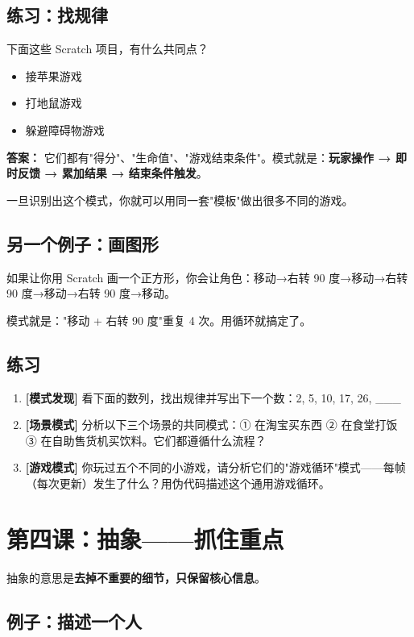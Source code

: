 \documentclass[a4paper,12pt]{ctexart}
\begin{document}
\subsection*{练习：找规律}

下面这些 Scratch 项目，有什么共同点？

\begin{itemize}
  \item 接苹果游戏
  \item 打地鼠游戏
  \item 躲避障碍物游戏
\end{itemize}

\textbf{答案：} 它们都有"得分"、"生命值"、"游戏结束条件"。模式就是：\textbf{玩家操作 → 即时反馈 → 累加结果 → 结束条件触发}。

一旦识别出这个模式，你就可以用同一套"模板"做出很多不同的游戏。

\subsection*{另一个例子：画图形}

如果让你用 Scratch 画一个正方形，你会让角色：移动→右转 90 度→移动→右转 90 度→移动→右转 90 度→移动。

模式就是："移动 + 右转 90 度"重复 4 次。用循环就搞定了。

\subsection*{练习}

\begin{enumerate}
  \item \textbf{[模式发现]} 看下面的数列，找出规律并写出下一个数：2, 5, 10, 17, 26, \_\_\_
  \item \textbf{[场景模式]} 分析以下三个场景的共同模式：① 在淘宝买东西 ② 在食堂打饭 ③ 在自助售货机买饮料。它们都遵循什么流程？
  \item \textbf{[游戏模式]} 你玩过五个不同的小游戏，请分析它们的"游戏循环"模式——每帧（每次更新）发生了什么？用伪代码描述这个通用游戏循环。
\end{enumerate}

\section*{第四课：抽象——抓住重点}

抽象的意思是\textbf{去掉不重要的细节，只保留核心信息}。

\subsection*{例子：描述一个人}
\end{document}
